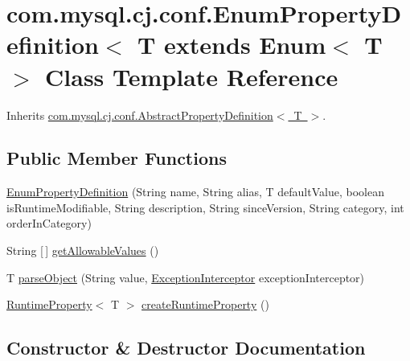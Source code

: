 \hypertarget{classcom_1_1mysql_1_1cj_1_1conf_1_1_enum_property_definition}{}\section{com.\+mysql.\+cj.\+conf.\+Enum\+Property\+Definition$<$ T extends Enum$<$ T $>$ Class Template Reference}
\label{classcom_1_1mysql_1_1cj_1_1conf_1_1_enum_property_definition}


Inherits \mbox{\hyperlink{classcom_1_1mysql_1_1cj_1_1conf_1_1_abstract_property_definition}{com.\+mysql.\+cj.\+conf.\+Abstract\+Property\+Definition$<$ T $>$}}.

\subsection*{Public Member Functions}
\begin{DoxyCompactItemize}
\item 
\mbox{\hyperlink{classcom_1_1mysql_1_1cj_1_1conf_1_1_enum_property_definition_a9e287073983d3b7f018138692ac1960d}{Enum\+Property\+Definition}} (String name, String alias, T default\+Value, boolean is\+Runtime\+Modifiable, String description, String since\+Version, String category, int order\+In\+Category)
\item 
String \mbox{[}$\,$\mbox{]} \mbox{\hyperlink{classcom_1_1mysql_1_1cj_1_1conf_1_1_enum_property_definition_a7e2ff8f6f7baf418abdae017a6bd8136}{get\+Allowable\+Values}} ()
\item 
T \mbox{\hyperlink{classcom_1_1mysql_1_1cj_1_1conf_1_1_enum_property_definition_a00a259a5d83a0a7c6522309ff44146ba}{parse\+Object}} (String value, \mbox{\hyperlink{interfacecom_1_1mysql_1_1cj_1_1exceptions_1_1_exception_interceptor}{Exception\+Interceptor}} exception\+Interceptor)
\item 
\mbox{\hyperlink{interfacecom_1_1mysql_1_1cj_1_1conf_1_1_runtime_property}{Runtime\+Property}}$<$ T $>$ \mbox{\hyperlink{classcom_1_1mysql_1_1cj_1_1conf_1_1_enum_property_definition_a463e1e063d6969ca3d352b31ea9324b5}{create\+Runtime\+Property}} ()
\end{DoxyCompactItemize}


\subsection{Constructor \& Destructor Documentation}
\mbox{\label{classcom_1_1mysql_1_1cj_1_1conf_1_1_enum_property_definition_a9e287073983d3b7f018138692ac1960d}} 
